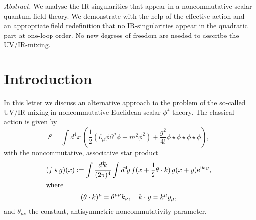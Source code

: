 \documentclass[a4paper,12pt]{article}
\begin{document}
\begin{titlepage}
\begin{center}

       
\end{center} 
\thispagestyle{empty}
\begin{center}
\begin{minipage}{12cm}

\vspace{10mm}

{\it Abstract.}   We analyse the IR-singularities that appear in a noncommutative scalar quantum field theory. We demonstrate with the help of the effective action and an appropriate field redefinition that no IR-singularities appear in the quadratic part at one-loop order. No new degrees of freedom are needed to describe the UV/IR-mixing.

\end{minipage}\end{center}
\end{titlepage}

\section{Introduction}
In this letter we discuss an alternative approach to the problem of the so-called UV/IR-mixing in noncommutative Euclidean scalar $\phi^4$-theory. The classical  action is given by 
\begin{equation}
  \label{action}
  S = \int d^4\!x \, \left( \frac{1}{2} (\partial_\mu \phi \partial^\mu \phi 
    + m^2 \phi^2)+
      \frac{g^2}{4!} \phi \star \phi \star \phi \star \phi \right),
\end{equation}
with the noncommutative, associative star product
\begin{gather}
  (f \star g)(x) := \int \frac{d^4\!k}{(2 \pi)^4} \int d^4\!y \, 
    f(x + \frac{1}{2} \theta \cdot k) \, g(x + y) \mathrm{e}^{\mathrm{i} k \cdot y}, 
      \nonumber \\
\intertext{where}
  (\theta \cdot k)^\mu = \theta^{\mu\nu} k_\nu, \quad k \cdot y = k^\mu y_\mu, 
\end{gather}
and $\theta_{\mu\nu}$ the constant, antisymmetric noncommutativity parameter.
\end{document}
